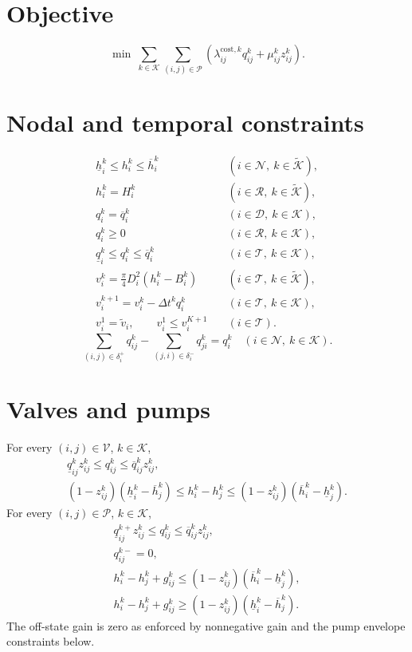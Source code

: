 \documentclass{article}
\begin{document}
\section*{Objective}
\begin{equation}
\min\ \sum_{k\in\mathcal K}\sum_{(i,j)\in\mathcal P}
\left(\lambda_{ij}^{\mathrm{cost},k}q_{ij}^k+\mu_{ij}^kz_{ij}^k\right).
\tag{14}
\end{equation}

\section*{Nodal and temporal constraints}
\begin{align}
\underline h_i^k\le h_i^k\le\overline h_i^k
&\quad(i\in\mathcal N,\ k\in\widetilde{\mathcal K}), \tag{1}\\
h_i^k=H_i^k
&\quad(i\in\mathcal R,\ k\in\widetilde{\mathcal K}), \tag{R1}\\
q_i^k=\overline q_i^k
&\quad(i\in\mathcal D,\ k\in\mathcal K), \tag{N1}\\
q_i^k\ge0
&\quad(i\in\mathcal R,\ k\in\mathcal K), \tag{N2}\\
\underline q_i^k\le q_i^k\le\overline q_i^k
&\quad(i\in\mathcal T,\ k\in\mathcal K), \tag{N3}\\
v_i^k=\frac{\pi}{4}D_i^2(h_i^k-B_i^k)
&\quad(i\in\mathcal T,\ k\in\widetilde{\mathcal K}), \tag{2}\\
v_i^{k+1}=v_i^k-\Delta t^kq_i^k
&\quad(i\in\mathcal T,\ k\in\mathcal K), \tag{3}\\
v_i^1=\widetilde v_i,\qquad v_i^1\le v_i^{K+1}
&\quad(i\in\mathcal T). \tag{12}
\end{align}
\begin{equation}
\sum_{(i,j)\in\delta_i^+}q_{ij}^k-
\sum_{(j,i)\in\delta_i^-}q_{ji}^k=q_i^k
\quad(i\in\mathcal N,\ k\in\mathcal K).
\tag{11}
\end{equation}

\section*{Valves and pumps}
For every $(i,j)\in\mathcal V$, $k\in\mathcal K$,
\begin{align}
\underline q_{ij}^kz_{ij}^k\le q_{ij}^k\le\overline q_{ij}^kz_{ij}^k, \tag{6}\\
(1-z_{ij}^k)(\underline h_i^k-\overline h_j^k)
\le h_i^k-h_j^k\le
(1-z_{ij}^k)(\overline h_i^k-\underline h_j^k). \tag{7}
\end{align}
For every $(i,j)\in\mathcal P$, $k\in\mathcal K$,
\begin{align}
\underline q_{ij}^{k+}z_{ij}^k\le q_{ij}^k\le\overline q_{ij}^kz_{ij}^k, \tag{8}\\
q_{ij}^{k-}=0, \tag{P1}\\
h_i^k-h_j^k+g_{ij}^k\le(1-z_{ij}^k)(\overline h_i^k-\underline h_j^k), \tag{10a}\\
h_i^k-h_j^k+g_{ij}^k\ge(1-z_{ij}^k)(\underline h_i^k-\overline h_j^k). \tag{10b}
\end{align}
The off-state gain is zero as enforced by nonnegative gain and the pump envelope constraints below.
\end{document}
